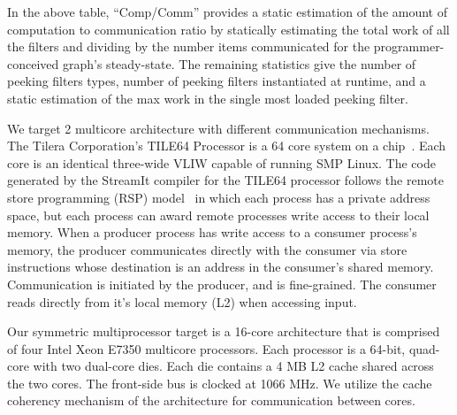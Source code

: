 In the above table, ``Comp/Comm'' provides a static estimation of the
amount of computation to communication ratio by statically estimating the total
work of all the filters and dividing by the number items communicated
for the programmer-conceived graph's steady-state.  The remaining
statistics give the number of peeking filters types, number of peeking
filters instantiated at runtime, and a static estimation of the max
work in the single most loaded peeking filter.

We target 2 multicore architecture with different communication
mechanisms.  The Tilera Corporation's TILE64 Processor is a 64 core
system on a chip~\cite{tilera}.  Each core is an identical three-wide
VLIW capable of running SMP Linux. The code generated by the StreamIt
compiler for the TILE64 processor follows the remote store programming
(RSP) model~\cite{rsp10} in which each process has a private address
space, but each process can award remote processes write access to
their local memory. When a producer process has write access to a
consumer process's memory, the producer communicates directly with the
consumer via store instructions whose destination is an address in the
consumer's shared memory.  Communication is initiated by the producer,
and is fine-grained.  The consumer reads directly from it's local
memory (L2) when accessing input.

Our symmetric multiprocessor target is a 16-core architecture that is
comprised of four Intel Xeon E7350 multicore processors.  Each processor
is a 64-bit, quad-core with two dual-core dies.  Each die contains a 4
MB L2 cache shared across the two cores.  The front-side bus is clocked
at 1066 MHz.  We utilize the cache coherency mechanism of the
architecture for communication between cores. 

